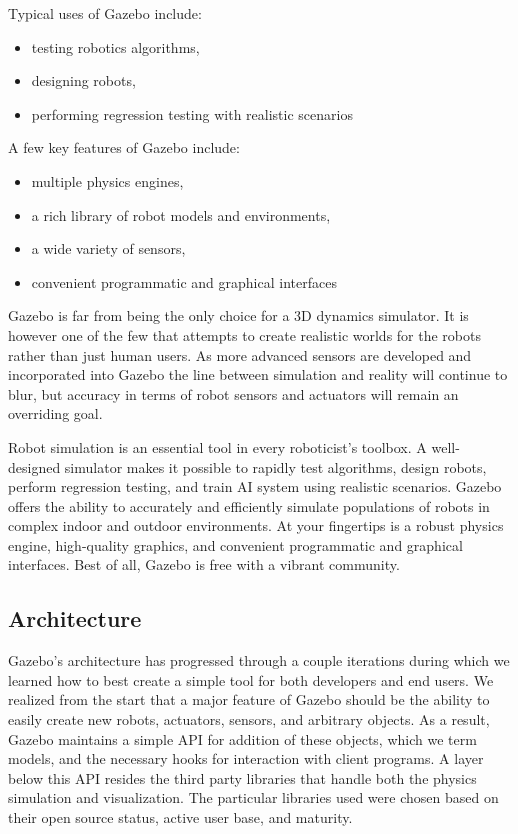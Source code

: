 Typical uses of Gazebo include:

\begin{itemize}
\item testing robotics algorithms,
\item designing robots,
\item performing regression testing with realistic scenarios
\end{itemize}

A few key features of Gazebo include:

\begin{itemize}
\item multiple physics engines,
\item a rich library of robot models and environments,
\item a wide variety of sensors,
\item convenient programmatic and graphical interfaces
\end{itemize}

Gazebo is far from being the only choice for a 3D dynamics simulator. It is however one of the few that attempts to create realistic worlds for the robots rather than just human users. As more advanced sensors are developed and incorporated into Gazebo the line between simulation and reality will continue to blur, but accuracy in terms of robot sensors and actuators will remain an overriding goal.

Robot simulation is an essential tool in every roboticist's toolbox. A well-designed simulator makes it possible to rapidly test algorithms, design robots, perform regression testing, and train AI system using realistic scenarios. Gazebo offers the ability to accurately and efficiently simulate populations of robots in complex indoor and outdoor environments. At your fingertips is a robust physics engine, high-quality graphics, and convenient programmatic and graphical interfaces. Best of all, Gazebo is free with a vibrant community.

\subsection{Architecture}

Gazebo's architecture has progressed through a couple iterations during which we learned how to best create a simple tool for both developers and end users. We realized from the start that a major feature of Gazebo should be the ability to easily create new robots, actuators, sensors, and arbitrary objects. As a result, Gazebo maintains a simple API for addition of these objects, which we term models, and the necessary hooks for interaction with client programs. A layer below this API resides the third party libraries that handle both the physics simulation and visualization. The particular libraries used were chosen based on their open source status, active user base, and maturity.

